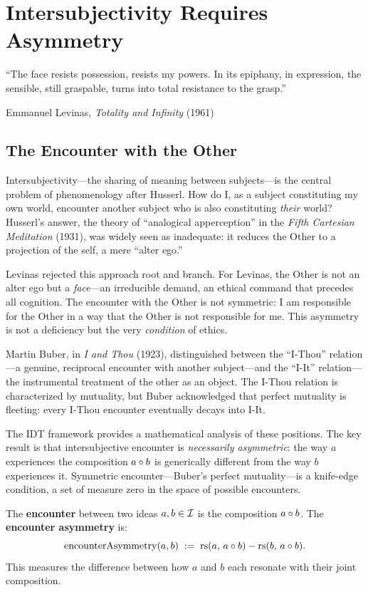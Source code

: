 \chapter{Intersubjectivity Requires Asymmetry}
\label{ch:intersubjectivity}

\epigraph{``The face resists possession, resists my powers.  In its epiphany,
in expression, the sensible, still graspable, turns into total
resistance to the grasp.''}{Emmanuel Levinas, \textit{Totality and
Infinity} (1961)}

\section{The Encounter with the Other}

Intersubjectivity---the sharing of meaning between subjects---is the central
problem of phenomenology after Husserl.  How do I, as a subject constituting
my own world, encounter another subject who is also constituting \emph{their}
world?  Husserl's answer, the theory of ``analogical apperception'' in the
\textit{Fifth Cartesian Meditation} (1931), was widely seen as inadequate:
it reduces the Other to a projection of the self, a mere ``alter ego.''

Levinas rejected this approach root and branch.  For Levinas, the Other is not
an alter ego but a \emph{face}---an irreducible demand, an ethical command that
precedes all cognition.  The encounter with the Other is not symmetric: I am
responsible for the Other in a way that the Other is not responsible for me.
This asymmetry is not a deficiency but the very \emph{condition} of ethics.

Martin Buber, in \textit{I and Thou} (1923), distinguished between the ``I-Thou''
relation---a genuine, reciprocal encounter with another subject---and the
``I-It'' relation---the instrumental treatment of the other as an object.
The I-Thou relation is characterized by mutuality, but Buber acknowledged that
perfect mutuality is fleeting: every I-Thou encounter eventually decays into
I-It.

The IDT framework provides a mathematical analysis of these positions.  The
key result is that intersubjective encounter is \emph{necessarily asymmetric}:
the way $a$ experiences the composition $a \circ b$ is generically different
from the way $b$ experiences it.  Symmetric encounter---Buber's perfect
mutuality---is a knife-edge condition, a set of measure zero in the space
of possible encounters.

\begin{definition}
\label{def:encounter}
The \textbf{encounter} between two ideas $a, b \in \mathcal{I}$ is the composition
$a \circ b$.  The \textbf{encounter asymmetry} is:
\[
\mathrm{encounterAsymmetry}(a, b) \;:=\;
\mathrm{rs}(a,\, a \circ b) - \mathrm{rs}(b,\, a \circ b).
\]
This measures the difference between how $a$ and $b$ each resonate with
their joint composition.
\end{definition}

